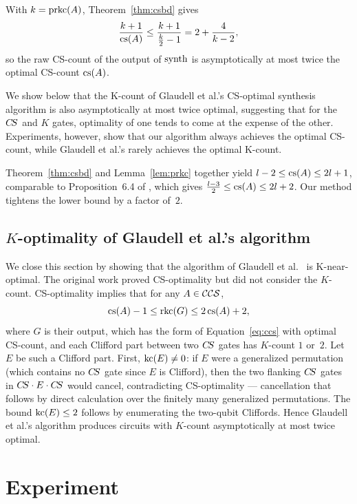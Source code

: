 \documentclass[reprint,amsmath,amssymb,aps,pra]{revtex4-2}
\begin{document}
\begin{corollary}
  With $k = \operatorname{prkc}(A)$, Theorem~\ref{thm:csbd} gives
  \[
    \frac{k+1}{\operatorname{cs}(A)} \le \frac{k+1}{\frac{k}{2} - 1} = 2 +
    \frac{4}{k-2},
  \]
  so the raw CS-count of the output of $\operatorname{synth}$ is asymptotically at
  most twice the optimal CS-count $\operatorname{cs}(A)$.
\end{corollary}

We show below that the K-count of Glaudell et al.'s CS-optimal
synthesis algorithm is also asymptotically at most twice optimal,
suggesting that for the $C\kern-.16667em S$ and $K$ gates, optimality of one tends
to come at the expense of the other. Experiments, however, show that
our algorithm always achieves the optimal CS-count, while Glaudell et
al.'s rarely achieves the optimal K-count.

\begin{remark}
  Theorem~\ref{thm:csbd} and Lemma~\ref{lem:prkc} together yield
  $l - 2 \le \operatorname{cs}(A) \le 2l + 1$, comparable to Proposition~6.4 of
  \cite{Glaudell2021}, which gives
  $\frac{l-3}{2} \le \operatorname{cs}(A) \le 2l + 2$. Our method tightens the lower
  bound by a factor of~$2$.
\end{remark}


\subsection{$K$-optimality of Glaudell et al.'s algorithm}
\label{sec:gk}

We close this section by showing that the algorithm of Glaudell et
al.\ \cite{Glaudell2021} is K-near-optimal. The original work proved
CS-optimality but did not consider the $K$-count. CS-optimality
implies that for any $A \in {\mathcal{CCS}}$,
\[
  \operatorname{cs}(A) -1 \le \operatorname{rkc}(G) \le 2 \operatorname{cs}(A) + 2,
\]
where $G$ is their output, which has the form of
Equation~\eqref{eq:ccs} with optimal CS-count, and each Clifford part
between two $C\kern-.16667em S$ gates has $K$-count $1$ or~$2$. Let $E$ be such a
Clifford part. First, $\operatorname{kc}(E) \neq 0$: if $E$ were a generalized
permutation (which contains no $C\kern-.16667em S$ gate since $E$ is Clifford), then
the two flanking $C\kern-.16667em S$ gates in $C\kern-.16667em S\cdot E\cdot C\kern-.16667em S$ would cancel,
contradicting CS-optimality — cancellation that follows by direct
calculation over the finitely many generalized permutations. The bound
$\operatorname{kc}(E) \le 2$ follows by enumerating the two-qubit Cliffords. Hence
Glaudell et al.'s algorithm produces circuits with $K$-count
asymptotically at most twice optimal.

\section{Experiment}
\label{sec:exp}
\end{document}
